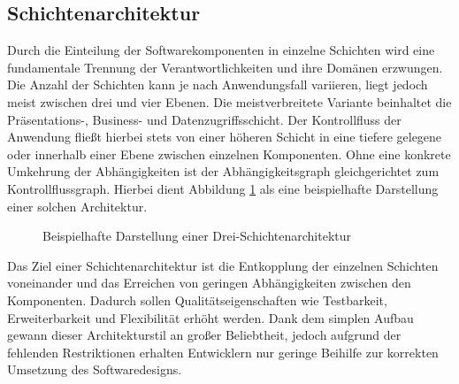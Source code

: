 \subsection{Schichtenarchitektur}


Durch die Einteilung der Softwarekomponenten in einzelne Schichten wird eine fundamentale Trennung der Verantwortlichkeiten und ihre Domänen erzwungen. Die Anzahl der Schichten kann je nach Anwendungsfall variieren, liegt jedoch meist zwischen drei und vier Ebenen. Die meistverbreitete Variante beinhaltet die Präsentations-, Business- und Datenzugriffsschicht. Der Kontrollfluss der Anwendung fließt hierbei stets von einer höheren Schicht in eine tiefere gelegene oder innerhalb einer Ebene zwischen einzelnen Komponenten. Ohne eine konkrete Umkehrung der Abhängigkeiten ist der Abhängigkeitsgraph gleichgerichtet zum Kontrollflussgraph. Hierbei dient Abbildung \ref{fig:Schichtenarchitektur} als eine beispielhafte Darstellung einer solchen Architektur. 

\begin{figure}[htbp]
	\centering
	\large
	
	\caption{Beispielhafte Darstellung einer Drei-Schichtenarchitektur}
	\label{fig:Schichtenarchitektur}
\end{figure}

Das Ziel einer Schichtenarchitektur ist die Entkopplung der einzelnen Schichten voneinander und das Erreichen von geringen Abhängigkeiten zwischen den Komponenten. Dadurch sollen Qualitätseigenschaften wie Testbarkeit, Erweiterbarkeit und Flexibilität erhöht werden. Dank dem simplen Aufbau gewann dieser Architekturstil an großer Beliebtheit, jedoch aufgrund der fehlenden Restriktionen erhalten Entwicklern nur geringe Beihilfe zur korrekten Umsetzung des Softwaredesigns. 

